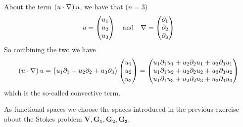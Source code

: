 \begin{remark}
    About the term \(\left( u \cdot \nabla \right) u\), we have that (\(n = 3\))
    \[
        u = \begin{pmatrix}
            u_1 \\
            u_2 \\
            u_3
        \end{pmatrix} \quad \text{and} \quad \nabla = \begin{pmatrix}
            \partial_1 \\
            \partial_2 \\
            \partial_3
        \end{pmatrix}
    \]
    So combining the two we have
    \[
        \begin{split}
            \left( u \cdot \nabla \right) u = \begin{pmatrix}
                                                 u_1 \partial_1 + u_2 \partial_2 + u_3 \partial_3
                                             \end{pmatrix} \begin{pmatrix}
                                                               u_1 \\
                                                               u_2 \\
                                                               u_3
                                                           \end{pmatrix} = \begin{pmatrix}
                                                                               u_1 \partial_1 u_1 + u_2 \partial_2 u_1 + u_3 \partial_3 u_1 \\
                                                                               u_1 \partial_1 u_2 + u_2 \partial_2
                                                                               u_2 + u_3 \partial_3 u_2                                     \\
                                                                               u_1 \partial_1 u_3 + u_2 \partial_2 u_3 + u_3 \partial_3 u_3
                                                                           \end{pmatrix}
        \end{split}
    \]
    which is the so-called convective term.
\end{remark}
As functional spaces we choose the spaces introduced in the previous exercise about the Stokes problem \(\bm{V}, \bm{G_1}, \bm{G_2}, \bm{G_3}\).

